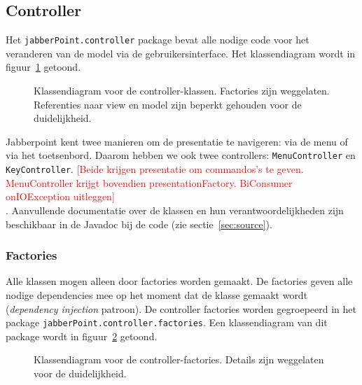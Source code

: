\documentclass[a4paper]{article}
\newcommand{\todo}[1]{\textcolor{red}{[#1]}\\}
\newcommand{\code}[1]{\lstinline[columns=fixed]{#1}}
\newcommand{\diagram}[3][1.3]{
	\begin{figure}[!htb]
	 \caption{#3}
	 \label{diagram:#2}
	 \makebox[\textwidth][c]{\texttt{[image: Diagrams/\#2.pdf]}}%
	\end{figure}
}
\begin{document}
	\subsection{Controller}\label{sec:controller}
		Het \code{jabberPoint.controller} package bevat alle nodige code voor het veranderen van de model via de gebruikersinterface.
		Het klassendiagram wordt in figuur~\ref{diagram:controller} getoond.

		\begin{figure}[!htb]
		 \caption{
			Klassendiagram voor de controller-klassen.\label{diagram:controller}
			Factories zijn weggelaten.
			Referenties naar view en model zijn beperkt gehouden voor de duidelijkheid.
		 }
		\end{figure}

		Jabberpoint kent twee manieren om de presentatie te navigeren: via de menu of via het toetsenbord.
		Daarom hebben we ook twee controllers: \code{MenuController} en \code{KeyController}.
		\todo{Beide krijgen presentatie om commandos's te geven. MenuController krijgt bovendien presentationFactory. BiConsumer onIOException uitleggen}.
		Aanvullende documentatie over de klassen en hun verantwoordelijkheden zijn beschikbaar in de Javadoc bij de code (zie sectie~\ref{sec:source}).

		\subsubsection{Factories}\label{sec:controller-factories}
			Alle klassen mogen alleen door factories worden gemaakt.
			De factories geven alle nodige dependencies mee op het moment dat de klasse gemaakt wordt (\textit{dependency injection} patroon).
			De controller factories worden gegroepeerd in het package \code{jabberPoint.controller.factories}.
			Een klassendiagram van dit package wordt in figuur~\ref{diagram:controller-factories} getoond.

			\diagram[0.8]{controller-factories}{
				Klassendiagram voor de controller-factories.\label{diagram:controller-factories}
				Details zijn weggelaten voor de duide\-lijk\-heid.
			}
\end{document}
